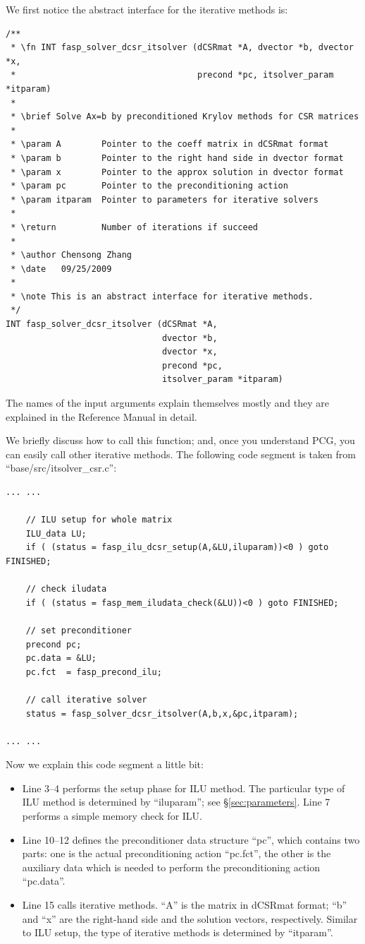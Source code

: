 \documentclass[11pt]{memoir}
\begin{document}
We first notice the abstract interface for the iterative methods is:
%
\begin{lstlisting}[numbers=none]
/**
 * \fn INT fasp_solver_dcsr_itsolver (dCSRmat *A, dvector *b, dvector *x,
 *                                    precond *pc, itsolver_param *itparam)
 *
 * \brief Solve Ax=b by preconditioned Krylov methods for CSR matrices
 *
 * \param A        Pointer to the coeff matrix in dCSRmat format
 * \param b        Pointer to the right hand side in dvector format
 * \param x        Pointer to the approx solution in dvector format
 * \param pc       Pointer to the preconditioning action
 * \param itparam  Pointer to parameters for iterative solvers
 *
 * \return         Number of iterations if succeed
 *
 * \author Chensong Zhang
 * \date   09/25/2009
 *
 * \note This is an abstract interface for iterative methods.
 */
INT fasp_solver_dcsr_itsolver (dCSRmat *A,
                               dvector *b,
                               dvector *x,
                               precond *pc,
                               itsolver_param *itparam)
\end{lstlisting}
%
The names of the input arguments explain themselves mostly and they are explained in the Reference Manual in detail.

We briefly discuss how to call this function; and, once you understand PCG, you can easily call other iterative methods. The following code segment is taken from ``base/src/itsolver\_csr.c'':
%
\begin{lstlisting}
... ...

    // ILU setup for whole matrix
    ILU_data LU;
    if ( (status = fasp_ilu_dcsr_setup(A,&LU,iluparam))<0 ) goto FINISHED;

    // check iludata
    if ( (status = fasp_mem_iludata_check(&LU))<0 ) goto FINISHED;

    // set preconditioner
    precond pc;
    pc.data = &LU;
    pc.fct  = fasp_precond_ilu;

    // call iterative solver
    status = fasp_solver_dcsr_itsolver(A,b,x,&pc,itparam);

... ...
\end{lstlisting}
%
Now we explain this code segment a little bit:
\begin{itemize}
\item Line 3--4 performs the setup phase for ILU method. The particular type of ILU method is determined by ``iluparam''; see \S\ref{sec:parameters}. Line 7 performs a simple memory check for ILU.
\item Line 10--12 defines the preconditioner data structure ``pc'', which contains two parts: one is the actual preconditioning action ``pc.fct'', the other is the auxiliary data which is needed to perform the preconditioning action ``pc.data''.
\item Line 15 calls iterative methods. ``A'' is the matrix in dCSRmat format; ``b'' and ``x'' are the right-hand side and the solution vectors, respectively. Similar to ILU setup, the type of iterative methods is determined by ``itparam''.
\end{itemize}
\end{document}
